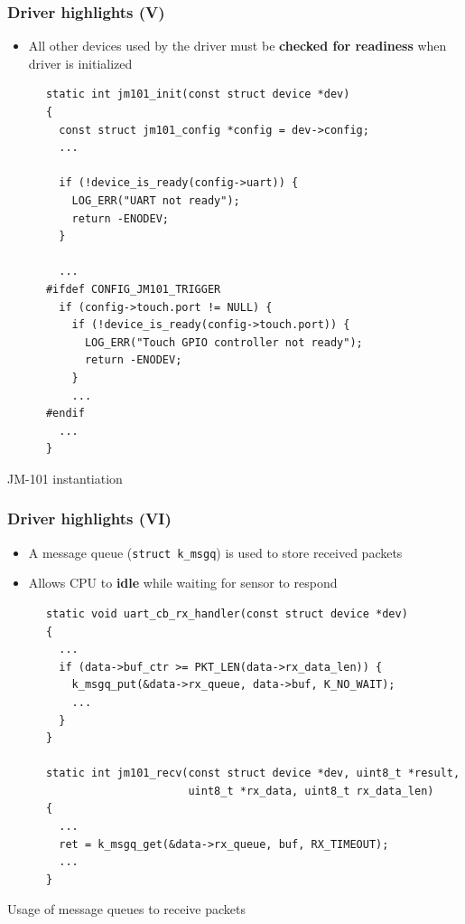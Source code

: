 \documentclass[handout]{beamer}
\begin{document}
\begin{frame}[fragile]
  \frametitle{Driver highlights (V)}

  \begin{itemize}
    \item All other devices used by the driver must be
          \textbf{checked for readiness} when driver is initialized
  \end{itemize}

  \begin{listing}[H]
    \begin{verbatim}
      static int jm101_init(const struct device *dev)
      {
        const struct jm101_config *config = dev->config;
        ...

        if (!device_is_ready(config->uart)) {
          LOG_ERR("UART not ready");
          return -ENODEV;
        }

        ...
      #ifdef CONFIG_JM101_TRIGGER
        if (config->touch.port != NULL) {
          if (!device_is_ready(config->touch.port)) {
            LOG_ERR("Touch GPIO controller not ready");
            return -ENODEV;
          }
          ...
      #endif
        ...
      }
    \end{verbatim}
    \caption{JM-101 instantiation}
  \end{listing}
\end{frame}

\begin{frame}[fragile]
  \frametitle{Driver highlights (VI)}

  \begin{itemize}
    \item A message queue (\texttt{struct k_msgq}) is used to store
          received packets
    \item Allows CPU to \textbf{idle} while waiting for sensor to respond
  \end{itemize}

  \begin{listing}[H]
    \begin{verbatim}
      static void uart_cb_rx_handler(const struct device *dev)
      {
        ...
        if (data->buf_ctr >= PKT_LEN(data->rx_data_len)) {
          k_msgq_put(&data->rx_queue, data->buf, K_NO_WAIT);
          ...
        }
      }

      static int jm101_recv(const struct device *dev, uint8_t *result,
                            uint8_t *rx_data, uint8_t rx_data_len)
      {
        ...
        ret = k_msgq_get(&data->rx_queue, buf, RX_TIMEOUT);
        ...
      }
    \end{verbatim}
    \caption{Usage of message queues to receive packets}
  \end{listing}
\end{frame}
\end{document}
